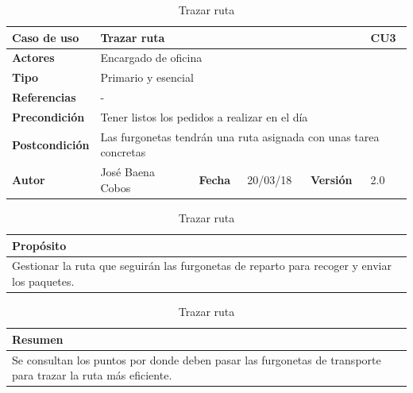 \documentclass[12pt,spanish]{article}
\begin{document}
\begin{table}[H]
\centering
\begin{tabular}{|m{3cm}|m{4cm}|m{2cm}|m{2cm}|m{2cm}|m{1cm}|}
\hline
\textbf{Caso de uso} &  \multicolumn{4}{m{8cm}|}{Trazar ruta} \vline &  \cellcolor{gray!40}CU3 \\
\hline
\textbf{Actores} & \multicolumn{5}{m{8cm}|}{Encargado de oficina} \\
\hline
\textbf{Tipo} & \multicolumn{5}{m{8cm}|}{Primario y esencial} \\
\hline
\textbf{Referencias} &\multicolumn{5}{m{8cm}|}{-} \\
\hline
\textbf{Precondición} & \multicolumn{5}{m{8cm}|}{Tener listos los pedidos a realizar en el día} \\
\hline
\textbf{Postcondición} & \multicolumn{5}{m{8cm}|}{Las furgonetas tendrán una ruta asignada con unas tarea concretas} \\
\hline
\textbf{Autor} & José Baena Cobos & \textbf{Fecha} & 20/03/18 & \textbf{Versión} & 2.0 \\
\hline
\end{tabular}

\vspace{1cm}

\begin{tabular}{|m{16.2cm}|}
\hline
\textbf{Propósito} \\
\hline
Gestionar la ruta que seguirán las furgonetas de reparto para recoger y enviar los paquetes. \\
\hline
\end{tabular}

\vspace{1cm}

\begin{tabular}{|m{16.2cm}|}
\hline
\textbf{Resumen} \\
\hline
Se consultan los puntos por donde deben pasar las furgonetas de transporte para trazar la ruta más eficiente. \\
\hline
\end{tabular}

\caption{Trazar ruta}
\label{cu:3}
\end{table}


\end{document}
